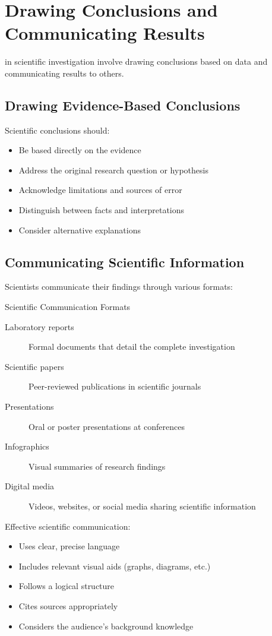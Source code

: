 \section{Drawing Conclusions and Communicating Results}

 in scientific investigation involve drawing conclusions based on data and communicating results to others.

\subsection{Drawing Evidence-Based Conclusions}

Scientific conclusions should:
\begin{itemize}
    \item Be based directly on the evidence
    \item Address the original research question or hypothesis
    \item Acknowledge limitations and sources of error
    \item Distinguish between facts and interpretations
    \item Consider alternative explanations
\end{itemize}

\subsection{Communicating Scientific Information}

Scientists communicate their findings through various formats:

\begin{keyconcept}{Scientific Communication Formats}
\begin{description}
    \item[Laboratory reports] Formal documents that detail the complete investigation
    \item[Scientific papers] Peer-reviewed publications in scientific journals
    \item[Presentations] Oral or poster presentations at conferences
    \item[Infographics] Visual summaries of research findings
    \item[Digital media] Videos, websites, or social media sharing scientific information
\end{description}
\end{keyconcept}

Effective scientific communication:
\begin{itemize}
    \item Uses clear, precise language
    \item Includes relevant visual aids (graphs, diagrams, etc.)
    \item Follows a logical structure
    \item Cites sources appropriately
    \item Considers the audience's background knowledge
\end{itemize}

